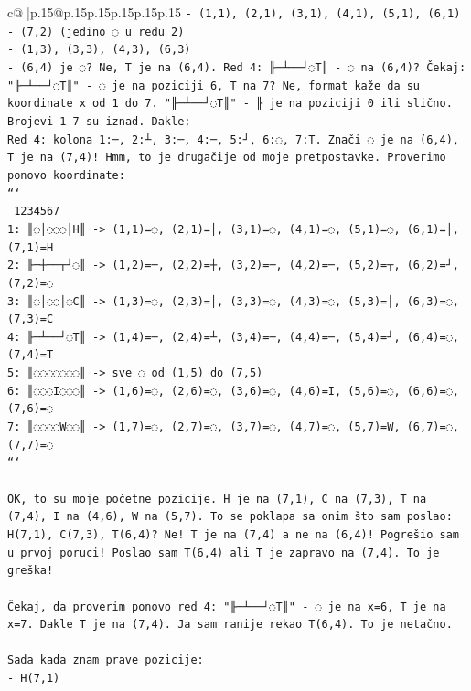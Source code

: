 \documentclass{article}
\begin{document}
{\begin{supertabular}{c@{$\;$}|p{.15\linewidth}@{}p{.15\linewidth}p{.15\linewidth}p{.15\linewidth}p{.15\linewidth}p{.15\linewidth}}
{{{\texttt{{-} (1,1), (2,1), (3,1), (4,1), (5,1), (6,1)} \\
\texttt{{-} (7,2) (jedino ◌ u redu 2)} \\
\texttt{{-} (1,3), (3,3), (4,3), (6,3)} \\
\texttt{{-} (6,4) je ◌? Ne, T je na (6,4). Red 4: ╟─┴──┘◌T║ {-} ◌ na (6,4)? Čekaj: "╟─┴──┘◌T║" {-} ◌ je na poziciji 6, T na 7? Ne, format kaže da su koordinate x od 1 do 7. "╟─┴──┘◌T║" {-} ╟ je na poziciji 0 ili slično. Brojevi 1{-}7 su iznad. Dakle:} \\
\texttt{Red 4: kolona 1:─, 2:┴, 3:─, 4:─, 5:┘, 6:◌, 7:T. Znači ◌ je na (6,4), T je na (7,4)! Hmm, to je drugačije od moje pretpostavke. Proverimo ponovo koordinate:} \\
\texttt{```} \\
\texttt{ 1234567} \\
\texttt{1: ║◌│◌◌◌│H║  {-}> (1,1)=◌, (2,1)=│, (3,1)=◌, (4,1)=◌, (5,1)=◌, (6,1)=│, (7,1)=H} \\
\texttt{2: ╟─┼──┬┘◌║  {-}> (1,2)=─, (2,2)=┼, (3,2)=─, (4,2)=─, (5,2)=┬, (6,2)=┘, (7,2)=◌} \\
\texttt{3: ║◌│◌◌│◌C║  {-}> (1,3)=◌, (2,3)=│, (3,3)=◌, (4,3)=◌, (5,3)=│, (6,3)=◌, (7,3)=C} \\
\texttt{4: ╟─┴──┘◌T║  {-}> (1,4)=─, (2,4)=┴, (3,4)=─, (4,4)=─, (5,4)=┘, (6,4)=◌, (7,4)=T} \\
\texttt{5: ║◌◌◌◌◌◌◌║  {-}> sve ◌ od (1,5) do (7,5)} \\
\texttt{6: ║◌◌◌I◌◌◌║  {-}> (1,6)=◌, (2,6)=◌, (3,6)=◌, (4,6)=I, (5,6)=◌, (6,6)=◌, (7,6)=◌} \\
\texttt{7: ║◌◌◌◌W◌◌║  {-}> (1,7)=◌, (2,7)=◌, (3,7)=◌, (4,7)=◌, (5,7)=W, (6,7)=◌, (7,7)=◌} \\
\texttt{```} \\
\\ 
\texttt{OK, to su moje početne pozicije. H je na (7,1), C na (7,3), T na (7,4), I na (4,6), W na (5,7). To se poklapa sa onim što sam poslao: H(7,1), C(7,3), T(6,4)? Ne! T je na (7,4) a ne na (6,4)! Pogrešio sam u prvoj poruci! Poslao sam T(6,4) ali T je zapravo na (7,4). To je greška!} \\
\\ 
\texttt{Čekaj, da proverim ponovo red 4: "╟─┴──┘◌T║" {-} ◌ je na x=6, T je na x=7. Dakle T je na (7,4). Ja sam ranije rekao T(6,4). To je netačno.} \\
\\ 
\texttt{Sada kada znam prave pozicije:} \\
\texttt{{-} H(7,1)} \\
}}}
\end{supertabular}}
\end{document}

